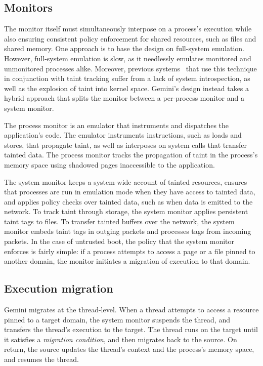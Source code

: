 \subsection{Monitors}
%
The monitor itself must simultaneously interpose on a process's execution while
also ensuring consistent policy enforcement for shared resources, such as files
and shared memory.
%
One approach is to base the design on full-system emulation.
%
However, full-system emulation is slow, as it needlessly emulates
monitored and unmonitored processes alike.
%
Moreover, previous
systems~\cite{whole-system-simulation,panorama,demand-emulation} that use this
technique in conjunction with taint tracking suffer from a lack of system
introspection, as well as the explosion of taint into kernel space.
%
Gemini's design instead takes a hybrid approach that splits the monitor between a
per-process monitor and a system monitor.



%
The process monitor is an emulator that instruments and dispatches the
application's code.
%
The emulator instruments instructions, such as
loads and stores, that propagate taint, as well as interposes on
system calls that transfer tainted data.
%
The process monitor tracks the propagation of taint in the process's
memory space using shadowed pages inaccessible to the application.
%

The system monitor keeps a system-wide account of tainted resources,
ensures that processes are run in emulation mode when they have access to
tainted data, and applies policy checks over tainted data, such as when data is
emitted to the network.
%
To track taint through storage, the system monitor applies persistent
taint tags to files.
%
To transfer tainted buffers over the network, the system monitor embeds taint
tags in outging packets and processes tags from incoming packets.
%
In the case of untrusted boot, the policy that the system monitor enforces is
fairly simple: if a process attempts to access a page or a file pinned to
another domain, the monitor initiates a migration of execution to that domain.


\subsection{Execution migration}

Gemini migrates at the thread-level.
%
When a thread attempts to access a resource pinned to a target domain,
the system monitor suspends the thread, and transfers the
thread's execution to the target.
%
The thread runs on the target until it satisfies a \emph{migration condition},
and then migrates back to the source.
%
On return, the source updates the thread's context and the process's memory
space, and resumes the thread.


